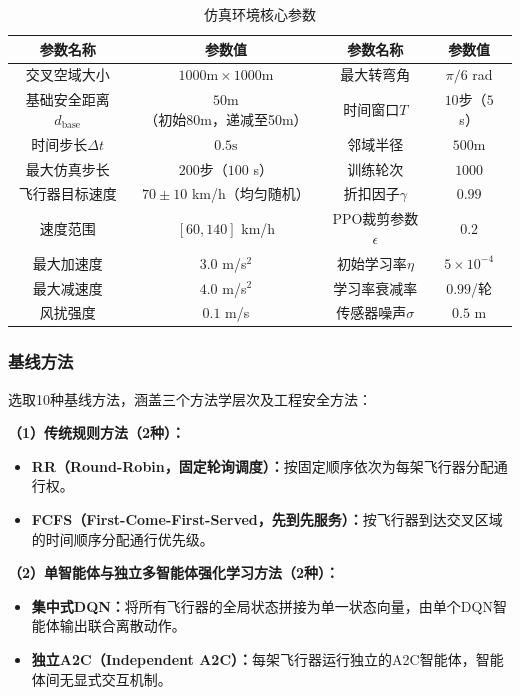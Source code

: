 \documentclass[12pt,a4paper,UTF8]{ctexart}
\begin{document}
\begin{table}[H]
    \centering
    \small
    \caption{仿真环境核心参数}
    \label{tab:env_params}
    \begin{tabular}{|c|c|c|c|}
        \hline
        \textbf{参数名称} & \textbf{参数值} & \textbf{参数名称} & \textbf{参数值} \\
        \hline
        交叉空域大小 & $1000\text{m} \times 1000\text{m}$ & 最大转弯角 & $\pi/6$ rad \\
        基础安全距离$d_{\text{base}}$ & $50\text{m}$（初始80m，递减至50m） & 时间窗口$T$ & $10$步（$5$ s） \\
        时间步长$\Delta t$ & $0.5\text{s}$ & 邻域半径 & $500\text{m}$ \\
        最大仿真步长 & $200$步（$100$ s） & 训练轮次 & $1000$ \\
        飞行器目标速度 & $70 \pm 10$ km/h（均匀随机） & 折扣因子$\gamma$ & $0.99$ \\
        速度范围 & $[60, 140]$ km/h & PPO裁剪参数$\epsilon$ & $0.2$ \\
        最大加速度 & $3.0$ m/s$^2$ & 初始学习率$\eta$ & $5 \times 10^{-4}$ \\
        最大减速度 & $4.0$ m/s$^2$ & 学习率衰减率 & $0.99$/轮 \\
        风扰强度 & $0.1$ m/s & 传感器噪声$\sigma$ & $0.5$ m \\
        \hline
    \end{tabular}
\end{table}

\subsubsection{基线方法}

选取10种基线方法，涵盖三个方法学层次及工程安全方法：

\textbf{（1）传统规则方法（2种）：}
\begin{itemize}
    \item \textbf{RR（Round-Robin，固定轮询调度）：}按固定顺序依次为每架飞行器分配通行权。
    \item \textbf{FCFS（First-Come-First-Served，先到先服务）：}按飞行器到达交叉区域的时间顺序分配通行优先级。
\end{itemize}

\textbf{（2）单智能体与独立多智能体强化学习方法（2种）：}
\begin{itemize}
    \item \textbf{集中式DQN：}将所有飞行器的全局状态拼接为单一状态向量，由单个DQN智能体输出联合离散动作。
    \item \textbf{独立A2C（Independent A2C）：}每架飞行器运行独立的A2C智能体，智能体间无显式交互机制。
\end{itemize}
\end{document}
